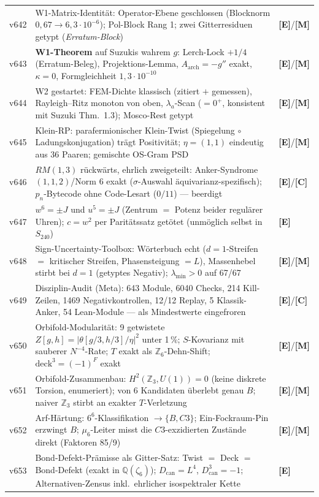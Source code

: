 \documentclass[11pt,a4paper]{article}
\newcommand{\E}{\textcolor{gut}{\textbf{[E]}}}
\newcommand{\C}{\textcolor{kern}{\textbf{[C]}}}
\newcommand{\M}{\textcolor{mess}{\textbf{[M]}}}
\begin{document}
\begin{longtable}{@{}l p{11.1cm} l@{}}
v642 & W1-Matrix-Identität: Operator-Ebene geschlossen (Blocknorm $0{,}67 \to 6{,}3 \cdot 10^{-6}$); Pol-Block Rang 1; zwei Gitterresiduen getypt (\emph{Erratum-Block}) & \E/\M \\
v643 & \textbf{W1-Theorem} auf Suzukis wahrem $g$: Lerch-Lock $+1/4$ (Erratum-Beleg), Projektions-Lemma, $A_{\mathrm{arch}} = -g''$ exakt, $\kappa = 0$, Formgleichheit $1{,}3 \cdot 10^{-10}$ & \E/\M \\
v644 & W2 gestartet: FEM-Dichte klassisch (zitiert $+$ gemessen), Rayleigh--Ritz monoton von oben, $\lambda_a$-Scan ($= 0^+$, konsistent mit Suzuki Thm.~1.3); Mosco-Rest getypt & \E/\M \\
v645 & Klein-RP: parafermionischer Klein-Twist (Spiegelung $\circ$ Ladungskonjugation) trägt Positivität; $\eta = (1,1)$ eindeutig aus 36 Paaren; gemischte OS-Gram PSD & \E/\M \\
v646 & $RM(1,3)$ rückwärts, ehrlich zweigeteilt: Anker-Syndrome $(1,1,2)$/Norm 6 exakt ($\sigma$-Auswahl äquivarianz-spezifisch); $p_n$-Bytecode ohne Code-Lesart ($0/11$) --- beerdigt & \E/\C \\
v647 & $w^6 = \pm J$ und $u^5 = \pm J$ (Zentrum $=$ Potenz beider regulärer Uhren); $c = w^2$ per Paritätssatz getötet (unmöglich selbst in $S_{240}$) & \E \\
v648 & Sign-Uncertainty-Toolbox: Wörterbuch echt ($d = 1$-Streifen $=$ kritischer Streifen, Phasensteigung $= L$), Massenhebel stirbt bei $d = 1$ (getyptes Negativ); $\lambda_{\min} > 0$ auf 67/67 & \E/\M \\
v649 & Disziplin-Audit (Meta): 643 Module, 6040 Checks, 214 Kill-Zeilen, 1469 Negativkontrollen, 12/12 Replay, 5 Klassik-Anker, 54 Lean-Module --- als Mindestwerte eingefroren & \E/\C \\
\midrule
v650 & Orbifold-Modularität: 9 getwistete $Z[g,h] = |\theta[g/3,h/3]/\eta|^2$ unter 1\,\%; $S$-Kovarianz mit sauberer $N^{-4}$-Rate; $T$ exakt als $\mathbb{Z}_6$-Dehn-Shift; $\mathrm{deck}^3 = (-1)^F$ exakt & \E/\M \\
v651 & Orbifold-Zusammenbau: $H^2(\mathbb{Z}_3, U(1)) = 0$ (keine diskrete Torsion, enumeriert); von 6 Kandidaten überlebt genau $B$; naiver $\mathbb{Z}_3$ stirbt an exakter $T$-Verletzung & \E/\M \\
v652 & Arf-Härtung: $6^6$-Klassifikation $\to \{B, C3\}$; Ein-Fockraum-Pin erzwingt $B$; $\mu_6$-Leiter misst die $C3$-exzidierten Zustände direkt (Faktoren 85/9) & \E/\M \\
v653 & Bond-Defekt-Prämisse als Gitter-Satz: Twist $=$ Deck $=$ Bond-Defekt (exakt in $\mathbb{Q}(\zeta_6)$); $D_{\mathrm{can}} = L^4$, $D_{\mathrm{can}}^3 = -1$; Alternativen-Zensus inkl.\ ehrlicher isospektraler Kette & \E \\

\end{longtable}
\end{document}
